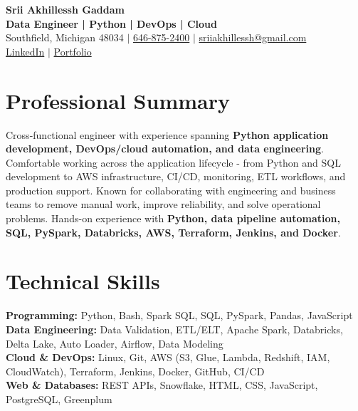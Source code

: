 \documentclass[letterpaper,10pt]{article}
\begin{document}
\fontsize{9.35pt}{10.45pt}\selectfont

\begin{center}
    {\LARGE \textbf{Srii Akhillessh Gaddam}} \\[-1pt]
    \textbf{Data Engineer | Python | DevOps | Cloud} \\[2pt]
    Southfield, Michigan 48034 $|$
    \href{tel:6468752400}{646-875-2400} $|$
    \href{mailto:sriiakhillessh@gmail.com}{sriiakhillessh@gmail.com} \\[1pt]
    \href{https://www.linkedin.com/in/srii-akhiilessh-gaddam-b48668191/}{LinkedIn} $|$
    \href{https://sriiakhillesshg.github.io/portfolio/}{Portfolio}
\end{center}
\vspace{-8pt}

\section{Professional Summary}
\small{Cross-functional engineer with experience spanning \textbf{Python application development, DevOps/cloud automation, and data engineering}. Comfortable working across the application lifecycle - from Python and SQL development to AWS infrastructure, CI/CD, monitoring, ETL workflows, and production support. Known for collaborating with engineering and business teams to remove manual work, improve reliability, and solve operational problems. Hands-on experience with \textbf{Python, data pipeline automation, SQL, PySpark, Databricks, AWS, Terraform, Jenkins, and Docker}.}

\section{Technical Skills}
\small{
\textbf{Programming:} Python, Bash, Spark SQL, SQL, PySpark, Pandas, JavaScript \\
\textbf{Data Engineering:} Data Validation, ETL/ELT, Apache Spark, Databricks, Delta Lake, Auto Loader, Airflow, Data Modeling \\
\textbf{Cloud \& DevOps:} Linux, Git, AWS (S3, Glue, Lambda, Redshift, IAM, CloudWatch), Terraform, Jenkins, Docker, GitHub, CI/CD \\
\textbf{Web \& Databases:} REST APIs, Snowflake, HTML, CSS, JavaScript, PostgreSQL, Greenplum
}

\end{document}
